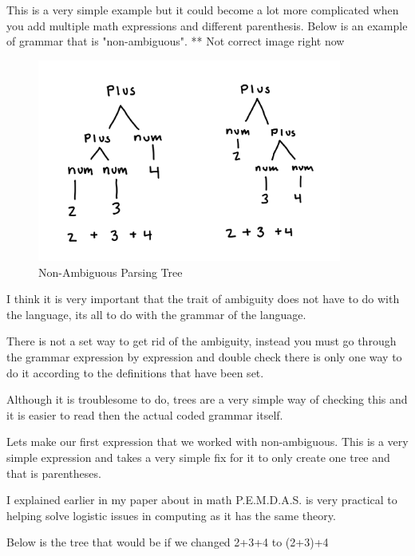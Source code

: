 \documentclass{article}
\begin{document}
\medskip\noindent
This is a very simple example but it could become a lot more complicated when you add multiple math expressions and different parenthesis. Below is an example of grammar that is "non-ambiguous". ** Not correct image right now

\medskip\noindent 
\begin{figure}[htp]
    \centering
    \includegraphics[width=10cm]{IMG_0653.jpg}
    \caption{ Non-Ambiguous Parsing Tree}
    \label{fig:Parsing Tree 2}
\end{figure}

\medskip\noindent
I think it is very important that the trait of ambiguity does not have to do with the language, its all to do with the grammar of the language. 

\medskip\noindent
There is not a set way to get rid of the ambiguity, instead you must go through the grammar expression by expression and double check there is only one way to do it according to the definitions that have been set.\cite{AG} 

\medskip\noindent
Although it is troublesome to do, trees are a very simple way of checking this and it is easier to read then the actual coded grammar itself.

\medskip\noindent
Lets make our first expression that we worked with non-ambiguous. This is a very simple expression and takes a very simple fix for it to only create one tree and that is parentheses. 

\medskip\noindent
I explained earlier in my paper about in math P.E.M.D.A.S. is very practical to helping solve logistic issues in computing as it has the same theory. 

\medskip\noindent
Below is the tree that would be if we changed 2+3+4 to (2+3)+4
\end{document}
